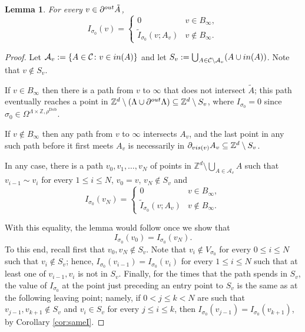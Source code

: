 \documentclass[11pt, reqno]{amsart}
\newtheorem{lemma}[theorem]{Lemma}
\newcommand{\Z}{\mathbb{Z}}
\DeclareMathOperator{\Dob}{Dob}
\numberwithin{equation}{section}
\begin{document}
\begin{lemma}\label{lem:tau_v_Av_Iv}
For every $v\in\partial^{\rm out}\tilde{A}$, 
$$
I_{\sigma_0}(v)=\begin{cases}
0 & v\in B_{\infty},\\
\tilde{I}_{\sigma_0}(v;A_v) & v\notin B_{\infty}.
\end{cases}
$$
\end{lemma}

\begin{proof}
Let $\mathcal{A}_v:=\{A\in\mathcal{C}\colon v\in{\rm in}(A)\}$
and let $S_v:=\bigcup_{A\in\mathcal{C}\setminus\mathcal{A}_v}(A\cup{\rm in}(A))$.
Note that $v\notin S_v$.

If $v\in B_{\infty}$ then there is a path from $v$ to $\infty$ that does not intersect $\tilde{A}$;
this path eventually reaches a point in ${\mathbb Z}^d\setminus(\Lambda\cup\partial^{\rm out}\Lambda)\subseteq {\mathbb Z}^d\setminus S_v$, where $I_{\sigma_0}=0$ since $\sigma_0\in\Omega^{\Lambda\times\Z, \rho^{\Dob}}$. 

If $v\notin B_{\infty}$ then any path from $v$ to $\infty$ intersects $A_v$, and the last point in any such path before it first meets $A_v$ is necessarily in $\partial_{{\rm vis}(v)}A_v\subseteq {\mathbb Z}^d\setminus S_v$. 

In any case, there is a path $v_0,v_1,\ldots,v_N$ of points in ${\mathbb Z}^d\setminus\bigcup_{A\in\mathcal{A}_v}A$ such that $v_{i-1}\sim v_i$ for every $1\leq i\leq N$, $v_0=v$, $v_N\notin S_v$ and
\begin{equation*}
I_{\sigma_0}(v_N)=\begin{cases}
0 & v\in B_{\infty},\\
\tilde{I}_{\sigma_0}(v;A_v) & v\notin B_{\infty}.
\end{cases}
\end{equation*}

With this equality, the lemma would follow once we show that
\begin{equation}\label{eq:same value at endpoints}
    I_{\sigma_0}(v_0)=I_{\sigma_0}(v_N).
\end{equation} 
To this end,
recall first that $v_0, v_N\notin S_v$. 
Note that $v_{i}\notin V_{\sigma_{0}}$ for every $0\leq i\leq N$ such that $v_{i} \notin S_{v}$;
hence, $I_{\sigma_{0}}(v_{i-1})=I_{\sigma_{0}}(v_{i})$ for every $1\leq i\leq N$ such that at least one of $v_{i-1}, v_i$ is not in $S_{v}$. 
Finally, for the times that the path spends in $S_{v}$, the value of $I_{\sigma_{0}}$ at the point just preceding an entry point to $S_v$ is the same as at the following leaving point;
namely, if $0<j\leq k<N$ are such that $v_{j-1}, v_{k+1}\notin S_v$ and $v_i\in S_v$ for every $j\leq i\leq k$, then $I_{\sigma_{0}}(v_{j-1})=I_{\sigma_{0}}(v_{k+1})$, by Corollary \ref{cor:sameI}.
\end{proof}
\end{document}
